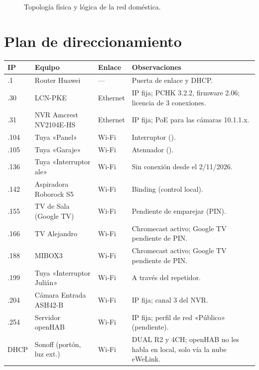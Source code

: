\documentclass[11pt,a4paper]{report}
\newcommand{\code}[1]{\texttt{\detokenize{#1}}}
\begin{document}
\begin{figure}[H]
{}
\caption{Topología física y lógica de la red doméstica.}
\label{fig:red}
\end{figure}

\section{Plan de direccionamiento}
\begin{longtable}{@{}lllp{6.2cm}@{}}
\toprule
\textbf{IP} & \textbf{Equipo} & \textbf{Enlace} & \textbf{Observaciones}\\\midrule\endhead
.1 & Router Huawei & — & Puerta de enlace y DHCP.\\
.30 & LCN-PKE & Ethernet & IP fija; PCHK 3.2.2, firmware 2.06; licencia de 3 conexiones.\\
.31 & NVR Amcrest NV2104E-HS & Ethernet & IP fija; PoE para las cámaras 10.1.1.x.\\
.104 & Tuya «Panel» & Wi-Fi & Interruptor (\code{switch_1}).\\
.105 & Tuya «Garaje» & Wi-Fi & Atenuador (\code{bright_value}).\\
.136 & Tuya «Interruptor ale» & Wi-Fi & Sin conexión desde el 2/11/2026.\\
.142 & Aspiradora Roborock S5 & Wi-Fi & Binding \code{miio} (control local).\\
.155 & TV de Sala (Google TV) & Wi-Fi & Pendiente de emparejar (PIN).\\
.166 & TV Alejandro & Wi-Fi & Chromecast activo; Google TV pendiente de PIN.\\
.188 & MIBOX3 & Wi-Fi & Chromecast activo; Google TV pendiente de PIN.\\
.199 & Tuya «Interruptor Julián» & Wi-Fi & A través del repetidor.\\
.204 & Cámara Entrada ASH42-B & Wi-Fi & IP fija; canal 3 del NVR.\\
.254 & Servidor openHAB & Wi-Fi & IP fija; perfil de red «Público» (pendiente).\\
DHCP & Sonoff (portón, luz ext.) & Wi-Fi & DUAL R2 y 4CH; openHAB no les habla en local, solo vía la nube eWeLink.\\
\bottomrule
\end{longtable}
\end{document}
